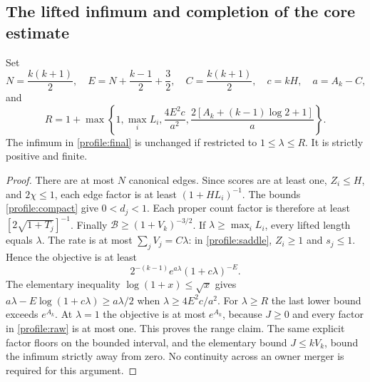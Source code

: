 \subsection{The lifted infimum and completion of the core estimate}
\begin{lemma}\label{profile:finite-search}
Set
\[
 N=\frac{k(k+1)}2,\quad E=N+\frac{k-1}2+\frac32,
 \quad C=\frac{k(k+1)}2,\quad c=kH,\quad a=A_k-C,
\]
and
\[
 R=1+\max\left\{1,\max_i L_i,
          \frac{4E^2c}{a^2},
          \frac{2[A_k+(k-1)\log2+1]}a\right\}.
\]
The infimum in \eqref{profile:final} is unchanged if restricted to
$1\leq\lambda\leq R$. It is strictly positive and finite.
\end{lemma}
\begin{proof}
There are at most $N$ canonical edges. Since scores are at least one,
$Z_i\leq H$, and $2\chi\leq1$, each edge factor is at least
$(1+HL_i)^{-1}$. The bounds \eqref{profile:compact} give $0<d_j<1$.
Each proper count factor is therefore at least
$[2\sqrt{1+T_j}]^{-1}$. Finally
$\mathcal B\geq(1+V_k)^{-3/2}$. If $\lambda\geq\max_iL_i$,
every lifted length equals $\lambda$. The rate is at most
$\sum_jV_j=C\lambda$: in \eqref{profile:saddle}, $Z_i\geq1$
and $s_j\leq1$. Hence the objective is at least
\[
 2^{-(k-1)}e^{a\lambda}(1+c\lambda)^{-E}.
\]
The elementary inequality $\log(1+x)\leq\sqrt x$ gives
$a\lambda-E\log(1+c\lambda)\geq a\lambda/2$ when
$\lambda\geq4E^2c/a^2$. For $\lambda\geq R$ the last lower bound
exceeds $e^{A_k}$. At $\lambda=1$ the objective is at most $e^{A_k}$,
because $J\geq0$ and every factor in \eqref{profile:raw} is at most
one. This proves the range claim. The same explicit factor floors
on the bounded interval, and the elementary bound $J\leq kV_k$,
bound the infimum strictly away from zero. No continuity across an
owner merger is required for this argument.
\end{proof}


